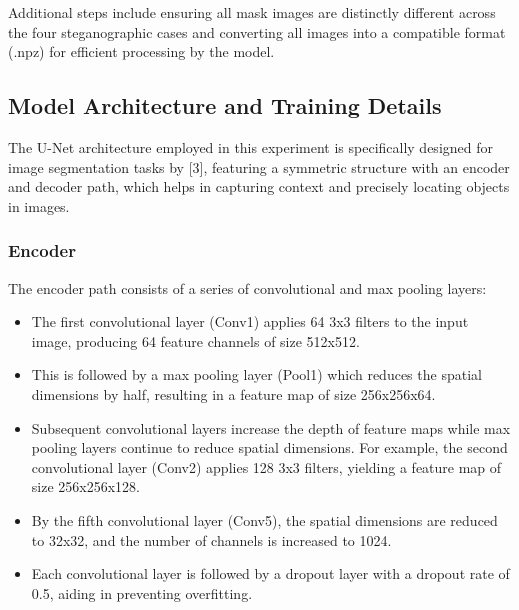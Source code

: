 \documentclass[12pt,a4paper]{article}
\begin{document}
Additional steps include ensuring all mask images are distinctly different across the four steganographic cases and converting all images into a compatible format (.npz) for efficient processing by the model.

\subsection{Model Architecture and Training Details}

The U-Net architecture employed in this experiment is specifically designed for image segmentation tasks by [3], featuring a symmetric structure with an encoder and decoder path, which helps in capturing context and precisely locating objects in images.
 
\subsubsection{Encoder}
The encoder path consists of a series of convolutional and max pooling layers:
\begin{itemize}
    \item The first convolutional layer (Conv1) applies 64 3x3 filters to the input image, producing 64 feature channels of size 512x512.
    \item This is followed by a max pooling layer (Pool1) which reduces the spatial dimensions by half, resulting in a feature map of size 256x256x64.
    \item Subsequent convolutional layers increase the depth of feature maps while max pooling layers continue to reduce spatial dimensions. For example, the second convolutional layer (Conv2) applies 128 3x3 filters, yielding a feature map of size 256x256x128.
    \item By the fifth convolutional layer (Conv5), the spatial dimensions are reduced to 32x32, and the number of channels is increased to 1024.
    \item Each convolutional layer is followed by a dropout layer with a dropout rate of 0.5, aiding in preventing overfitting.
\end{itemize}
\end{document}
